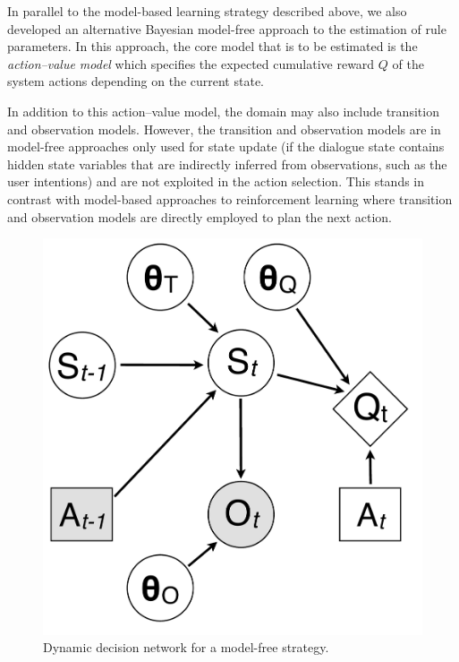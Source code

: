 In parallel to the model-based learning strategy described above, we also developed an alternative Bayesian model-free approach to the estimation of rule parameters.  In this approach, the core model that is to be estimated is the \textit{action--value model} which specifies the expected cumulative reward $Q$ of the system actions depending on the current state. 

In addition to this action--value model, the domain may also include transition and observation models. However, the transition and observation models are in model-free approaches only used for state update (if the dialogue state contains hidden state variables that are indirectly inferred from observations, such as the user intentions) and are not exploited in the action selection.  This stands in contrast with model-based approaches to reinforcement learning where transition and observation  models are directly employed to plan the next action.

\begin{figure}
\vspace{-2mm}
\centering
\includegraphics[scale=0.25]{imgs/modelfreediagram.pdf}
\vspace{-2mm}
\caption{Dynamic decision network for a model-free strategy.}
\label{fig:modelfreediagram}
\end{figure}

